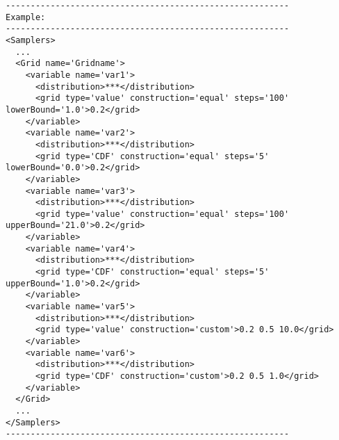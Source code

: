 \begin{lstlisting}[style=XML]
---------------------------------------------------------
Example:
---------------------------------------------------------
<Samplers>
  ...
  <Grid name='Gridname'> 
    <variable name='var1'> 
      <distribution>***</distribution>
      <grid	type='value' construction='equal' steps='100' lowerBound='1.0'>0.2</grid>	
    </variable> 
    <variable name='var2'> 
      <distribution>***</distribution>
      <grid	type='CDF' construction='equal' steps='5' lowerBound='0.0'>0.2</grid>	
    </variable>
    <variable name='var3'> 
      <distribution>***</distribution>
      <grid	type='value' construction='equal' steps='100' upperBound='21.0'>0.2</grid>	
    </variable> 
    <variable name='var4'> 
      <distribution>***</distribution>
      <grid	type='CDF' construction='equal' steps='5' upperBound='1.0'>0.2</grid>	
    </variable>
    <variable name='var5'> 
      <distribution>***</distribution>
      <grid	type='value' construction='custom'>0.2 0.5 10.0</grid>	
    </variable> 
    <variable name='var6'> 
      <distribution>***</distribution>
      <grid	type='CDF' construction='custom'>0.2 0.5 1.0</grid>	
    </variable>
  </Grid>
  ...
</Samplers>
---------------------------------------------------------
\end{lstlisting}

